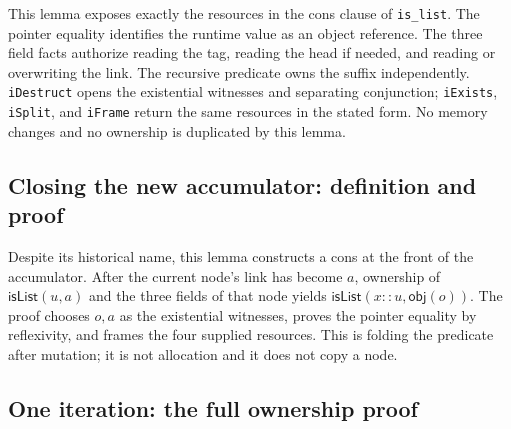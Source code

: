 \documentclass[11pt]{article}
\begin{document}
\begin{minipage}{\linewidth}

\end{minipage}

This lemma exposes exactly the resources in the cons clause of
\texttt{is\_list}. The pointer equality identifies the runtime value as an
object reference. The three field facts authorize reading the tag, reading the
head if needed, and reading or overwriting the link. The recursive predicate
owns the suffix independently. \texttt{iDestruct} opens the existential
witnesses and separating conjunction; \texttt{iExists}, \texttt{iSplit}, and
\texttt{iFrame} return the same resources in the stated form. No memory changes
and no ownership is duplicated by this lemma.

\subsection{Closing the new accumulator: definition and proof}

\begin{minipage}{\linewidth}

\end{minipage}

Despite its historical name, this lemma constructs a cons at the front of the
accumulator. After the current node's link has become \(a\), ownership of
\(\mathsf{isList}(u,a)\) and the three fields of that node yields
\(\mathsf{isList}(x::u,\mathsf{obj}(o))\). The proof chooses \(o,a\) as the
existential witnesses, proves the pointer equality by reflexivity, and frames
the four supplied resources. This is folding the predicate after mutation;
it is not allocation and it does not copy a node.

\subsection{One iteration: the full ownership proof}


\end{document}
